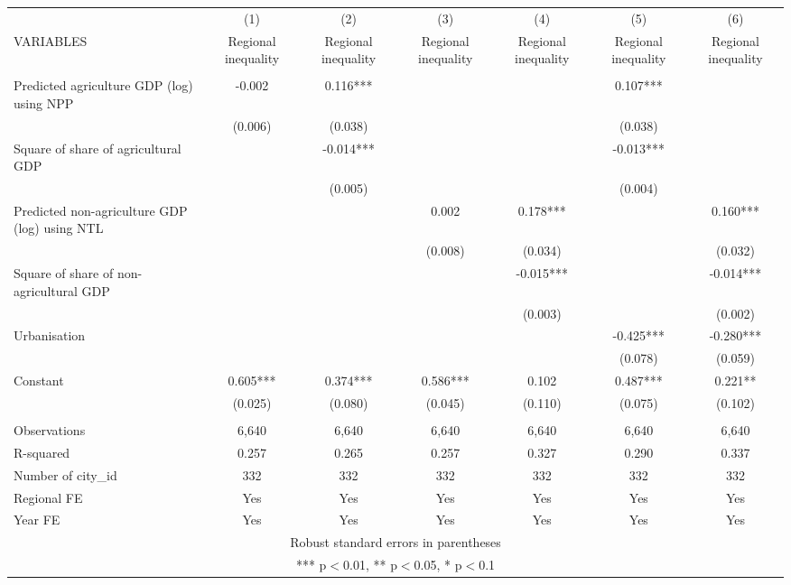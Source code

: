 \documentclass[]{article}
\begin{document}
\begin{tabular}{lcccccc} \hline
 & (1) & (2) & (3) & (4) & (5) & (6) \\
VARIABLES & Regional inequality & Regional inequality & Regional inequality & Regional inequality & Regional inequality & Regional inequality \\ \hline
 &  &  &  &  &  &  \\
Predicted agriculture GDP (log) using NPP & -0.002 & 0.116*** &  &  & 0.107*** &  \\
 & (0.006) & (0.038) &  &  & (0.038) &  \\
Square of share of agricultural GDP &  & -0.014*** &  &  & -0.013*** &  \\
 &  & (0.005) &  &  & (0.004) &  \\
Predicted non-agriculture GDP (log) using NTL &  &  & 0.002 & 0.178*** &  & 0.160*** \\
 &  &  & (0.008) & (0.034) &  & (0.032) \\
Square of share of non-agricultural GDP &  &  &  & -0.015*** &  & -0.014*** \\
 &  &  &  & (0.003) &  & (0.002) \\
Urbanisation &  &  &  &  & -0.425*** & -0.280*** \\
 &  &  &  &  & (0.078) & (0.059) \\
Constant & 0.605*** & 0.374*** & 0.586*** & 0.102 & 0.487*** & 0.221** \\
 & (0.025) & (0.080) & (0.045) & (0.110) & (0.075) & (0.102) \\
 &  &  &  &  &  &  \\
Observations & 6,640 & 6,640 & 6,640 & 6,640 & 6,640 & 6,640 \\
R-squared & 0.257 & 0.265 & 0.257 & 0.327 & 0.290 & 0.337 \\
Number of city\_id & 332 & 332 & 332 & 332 & 332 & 332 \\
Regional FE & Yes & Yes & Yes & Yes & Yes & Yes \\
 Year FE & Yes & Yes & Yes & Yes & Yes & Yes \\ \hline
\multicolumn{7}{c}{ Robust standard errors in parentheses} \\
\multicolumn{7}{c}{ *** p$<$0.01, ** p$<$0.05, * p$<$0.1} \\
\end{tabular}
\end{document}
